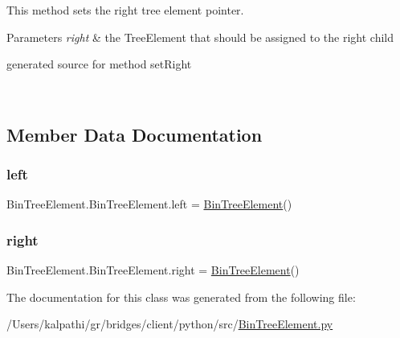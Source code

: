This method sets the right tree element pointer. 


\begin{DoxyParams}{Parameters}
{\em right} & the Tree\+Element that should be assigned to the right child\begin{DoxyVerb}generated source for method setRight \end{DoxyVerb}
 \\
\hline
\end{DoxyParams}


\subsection{Member Data Documentation}
\hypertarget{class_bin_tree_element_1_1_bin_tree_element_a73a75929ad5c317a59915283866ddb7a}{}\label{class_bin_tree_element_1_1_bin_tree_element_a73a75929ad5c317a59915283866ddb7a} 
\subsubsection{\texorpdfstring{left}{left}}
{\footnotesize\ttfamily Bin\+Tree\+Element.\+Bin\+Tree\+Element.\+left = \hyperlink{class_bin_tree_element_1_1_bin_tree_element}{Bin\+Tree\+Element}()\hspace{0.3cm}{\ttfamily [static]}}

\hypertarget{class_bin_tree_element_1_1_bin_tree_element_a9e5201df4cc9cc2a970b35ba036bca5a}{}\label{class_bin_tree_element_1_1_bin_tree_element_a9e5201df4cc9cc2a970b35ba036bca5a} 
\subsubsection{\texorpdfstring{right}{right}}
{\footnotesize\ttfamily Bin\+Tree\+Element.\+Bin\+Tree\+Element.\+right = \hyperlink{class_bin_tree_element_1_1_bin_tree_element}{Bin\+Tree\+Element}()\hspace{0.3cm}{\ttfamily [static]}}



The documentation for this class was generated from the following file\+:\begin{DoxyCompactItemize}
\item 
/\+Users/kalpathi/gr/bridges/client/python/src/\hyperlink{_bin_tree_element_8py}{Bin\+Tree\+Element.\+py}\end{DoxyCompactItemize}
